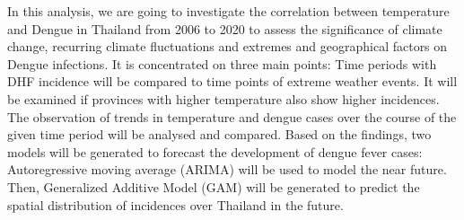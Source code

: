 In this analysis, we are going to investigate the correlation between temperature and Dengue in Thailand from 2006 to 2020 to assess the significance of climate change, recurring climate fluctuations and extremes and geographical factors on Dengue infections.
It is concentrated on three main points: Time periods with DHF incidence will be compared to time points of extreme weather events. It will be examined if provinces with higher temperature also show higher incidences. The observation of trends in temperature and dengue cases over the course of the given time period will be analysed and compared. 
Based on the findings, two models will be generated to forecast the development of dengue fever cases: Autoregressive moving average (ARIMA) will be used to model the near future. Then, Generalized Additive Model (GAM) will be generated to predict the spatial distribution of incidences over Thailand in the future. 

